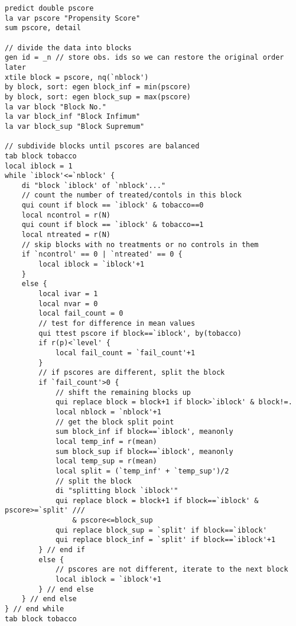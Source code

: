 \documentclass{article}
\begin{document}
\begin{verbatim}
predict double pscore
la var pscore "Propensity Score"
sum pscore, detail

// divide the data into blocks
gen id = _n // store obs. ids so we can restore the original order later
xtile block = pscore, nq(`nblock')
by block, sort: egen block_inf = min(pscore)
by block, sort: egen block_sup = max(pscore)
la var block "Block No."
la var block_inf "Block Infimum"
la var block_sup "Block Supremum"

// subdivide blocks until pscores are balanced
tab block tobacco
local iblock = 1
while `iblock'<=`nblock' {
	di "block `iblock' of `nblock'..."
	// count the number of treated/contols in this block
	qui count if block == `iblock' & tobacco==0
	local ncontrol = r(N)
	qui count if block == `iblock' & tobacco==1
	local ntreated = r(N)
	// skip blocks with no treatments or no controls in them
	if `ncontrol' == 0 | `ntreated' == 0 {
		local iblock = `iblock'+1
	}
	else {
		local ivar = 1
		local nvar = 0
		local fail_count = 0
		// test for difference in mean values
		qui ttest pscore if block==`iblock', by(tobacco)
		if r(p)<`level' {
			local fail_count = `fail_count'+1
		}
		// if pscores are different, split the block
		if `fail_count'>0 {
			// shift the remaining blocks up
			qui replace block = block+1 if block>`iblock' & block!=.
			local nblock = `nblock'+1
			// get the block split point
			sum block_inf if block==`iblock', meanonly
			local temp_inf = r(mean)
			sum block_sup if block==`iblock', meanonly
			local temp_sup = r(mean)
			local split = (`temp_inf' + `temp_sup')/2
			// split the block
			di "splitting block `iblock'"
			qui replace block = block+1 if block==`iblock' & pscore>=`split' ///
				& pscore<=block_sup
			qui replace block_sup = `split' if block==`iblock'
			qui replace block_inf = `split' if block==`iblock'+1
		} // end if
		else {
			// pscores are not different, iterate to the next block
			local iblock = `iblock'+1
		} // end else
	} // end else
} // end while
tab block tobacco


\end{verbatim}
\end{document}
